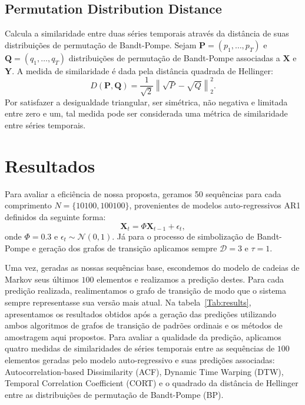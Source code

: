 \documentclass[10pt]{article}
\begin{document}
\subsection*{Permutation Distribution Distance} \label{BP}

Calcula a similaridade entre duas séries temporais através da distância de suas distribuições de permutação de Bandt-Pompe.
Sejam $\bm P = (p_1, \dots, p_T)$ e $\bm Q = (q_1, \dots, q_T)$ distribuições de permutação de Bandt-Pompe associadas a $\bm X$ e $\bm Y$.
A medida de similaridade é dada pela distância quadrada de Hellinger: 
\begin{equation*}
    D(\bm P, \bm Q) = \frac{1}{\sqrt{2}} \left\|\sqrt{P} - \sqrt{Q} \right\|^2_2.
\end{equation*}
Por satisfazer a desigualdade triangular, ser simétrica, não negativa e limitada entre zero e um, tal medida pode ser considerada uma métrica de similaridade entre séries temporais.

\section*{Resultados} \label{results}

Para avaliar a eficiência de nossa proposta, geramos \num{50} sequências para cada comprimento $N = \{10100, 100100\}$, provenientes de modelos auto-regressivos AR1 definidos da seguinte forma: 
\begin{equation*}
    \bm X_t = \Phi \bm X_{t-1} + \epsilon_t,
\end{equation*}
onde $\Phi = 0.3$ e $\epsilon_t \sim \mathcal{N}(0, 1)$.
Já para o processo de simbolização de Bandt-Pompe e geração dos grafos de transição aplicamos sempre $\mathcal D = 3$ e $\tau = 1$.

Uma vez, geradas as nossas sequências base, escondemos do modelo de cadeias de Markov seus últimos $100$ elementos e realizamos a predição destes.
Para cada predição realizada, realimentamos o grafo de transição de modo que o sistema sempre representasse sua versão mais atual.
Na tabela~\ref{Tab:results}, apresentamos os resultados obtidos após a geração das predições utilizando ambos algoritmos de grafos de transição de padrões ordinais e os métodos de amostragem aqui propostos.
Para avaliar a qualidade da predição, aplicamos quatro medidas de similaridades de séries temporais entre as sequências de $100$ elementos geradas pelo modelo auto-regressivo e suas predições associadas: Autocorrelation-based Dissimilarity (ACF), Dynamic Time Warping (DTW), Temporal Correlation Coefficient (CORT) e o quadrado da distância de Hellinger entre as distribuições de permutação de Bandt-Pompe (BP).
\end{document}
